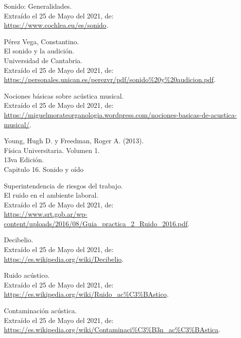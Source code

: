 \documentclass[letter,11pt]{article}
\begin{document}
\begin{thebibliography}{99}

 Sonido: Generalidades.\\
Extraído el 25 de Mayo del 2021, de:\\
{\small \url{https://www.cochlea.eu/es/sonido}.}

 Pérez Vega, Constantino.\\
El sonido y la audición.\\
Universidad de Cantabria.\\
Extraído el 25 de Mayo del 2021, de: \\
{\small \url{https://personales.unican.es/perezvr/pdf/sonido%20y%20audicion.pdf}.}

 Nociones básicas sobre acústica musical.\\
Extraído el 25 de Mayo del 2021, de: \\
{\small \url{https://miguelmorateorganologia.wordpress.com/nociones-basicas-de-acustica-musical/}.}

 Young, Hugh D. y Freedman, Roger A. (2013).\\
Física Universitaria. Volumen 1.\\
13va Edición.\\
Capitulo 16. Sonido y oído

 Superintendencia de riesgos del trabajo.\\
El ruido en el ambiente laboral.\\
Extraído el 25 de Mayo del 2021, de: \\
{\small \url{https://www.srt.gob.ar/wp-content/uploads/2016/08/Guia_practica_2_Ruido_2016.pdf}.}

 Decibelio.\\
Extraído el 25 de Mayo del 2021, de: \\
{\small \url{https://es.wikipedia.org/wiki/Decibelio}.}

 Ruido acústico.\\
Extraído el 25 de Mayo del 2021, de: \\
{\small \url{https://es.wikipedia.org/wiki/Ruido_ac%C3%BAstico}.}

 Contaminación acústica.\\
Extraído el 25 de Mayo del 2021, de: \\
{\small \url{https://es.wikipedia.org/wiki/Contaminaci%C3%B3n_ac%C3%BAstica}.}


\end{thebibliography}
\end{document}
